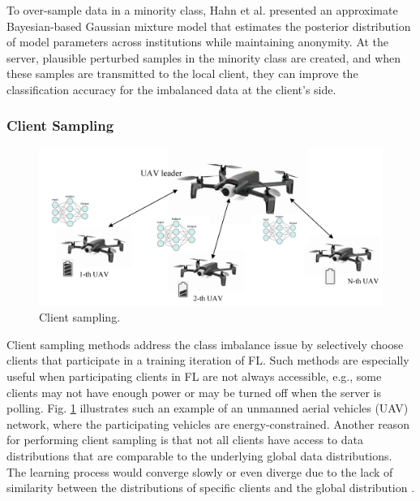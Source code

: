 \documentclass[10pt,journal,compsoc]{IEEEtran}
\begin{document}
To over-sample data in a minority class, Hahn et al. \cite{hahn2019privacy} presented an approximate Bayesian-based Gaussian mixture model that estimates the posterior distribution of model parameters across institutions while maintaining anonymity. At the server, plausible perturbed samples in the minority class are created, and when these samples are transmitted to the local client, they can improve the classification accuracy for the imbalanced data at the client's side.
\vspace{-0.25cm}

\subsubsection{Client Sampling}

\begin{figure}[h]
	\centering
	\setlength{\abovecaptionskip}{-0.2cm}
	\includegraphics[scale=0.45]{clientsampling.png}
	\caption{Client sampling.}
	\label{Client sampling}
\end{figure}
\vspace{-0.2cm}

Client sampling methods address the class imbalance issue by selectively choose clients that participate in a training iteration of FL. Such methods are especially useful when participating clients in FL are not always accessible, e.g., some clients may not have enough power or may be turned off when the server is polling. Fig. \ref{Client sampling} illustrates such an example of an unmanned aerial vehicles (UAV) network, where the participating vehicles are energy-constrained. Another reason for performing client sampling is that not all clients have access to data distributions that are comparable to the underlying global data distributions. The learning process would converge slowly or even diverge due to the lack of similarity between the distributions of specific clients and the global distribution \cite{chen2021novel} \cite{goetz2019active}. 
\end{document}
